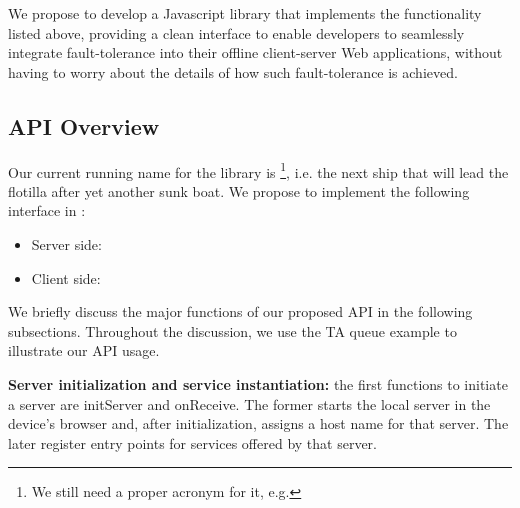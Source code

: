 We propose to develop a Javascript library that implements the functionality listed above, providing a clean interface to enable developers to seamlessly integrate fault-tolerance into their offline client-server Web applications, without having to worry about the details of how such fault-tolerance is achieved.

\subsection{API Overview}

Our current running name for the library is \texttt{\APIName}\footnote{We still need a proper acronym for it, e.g. \APIshort}, i.e. the next ship that will lead the flotilla after yet another sunk boat. We propose to implement the following interface in \APIName:


\begin{itemize}
	\item Server side:
    \begin{itemize}
    \end{itemize}
    \item Client side:
    	\begin{itemize}
    	\end{itemize}
\end{itemize}


We briefly discuss the major functions of our proposed API in the following subsections. Throughout the discussion, we use the TA queue example to illustrate our API usage.

{\bf Server initialization and service instantiation: } the first functions to initiate a server are {\ttfamily initServer} and {\ttfamily onReceive}. The former starts the local server in the device's browser and, after initialization, assigns a host name for that server. The later register entry points for services offered by that server.

